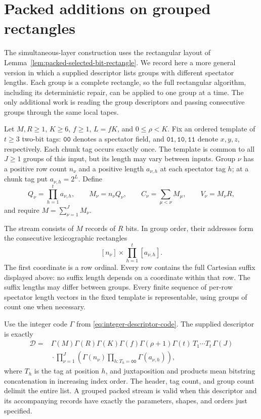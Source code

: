 \section{Packed additions on grouped rectangles}
\label{sec:grouped-rectangles}

The simultaneous-layer construction uses the rectangular layout of
Lemma~\ref{lem:packed-selected-bit-rectangle}. We record here a more
general version in which a supplied descriptor lists groups with different
spectator lengths. Each group is a complete rectangle, so the full
rectangular algorithm, including its deterministic repair, can be applied
to one group at a time. The only additional work is reading the group
descriptors and passing consecutive groups through the same local tapes.

\begin{definition}
\label{def:grouped-packed-stream}
Let $M,R\ge1$, $K\ge6$, $f\ge1$, $L=fK$, and $0\le\rho<K$.
Fix an ordered template of $t\ge3$ two-bit tags: $\mathtt{00}$ denotes
a spectator field, and $\mathtt{01},\mathtt{10},\mathtt{11}$ denote
$x,y,z$, respectively. Each chunk tag occurs exactly once. The template
is common to all $J\ge1$ groups of this input, but its length may vary
between inputs. Group $\nu$ has a positive row count $n_\nu$ and a
positive length $a_{\nu,h}$ at each spectator tag $h$; at a chunk tag
put $a_{\nu,h}=2^L$. Define
\[
 Q_\nu=\prod_{h=1}^t a_{\nu,h},\qquad
 M_\nu=n_\nu Q_\nu,\qquad
 C_\nu=\sum_{\mu<\nu}M_\mu,\qquad V_\nu=M_\nu R,
\]
and require $M=\sum_{\nu=1}^J M_\nu$.

The stream consists of $M$ records of $R$ bits. In group order, their
addresses form the consecutive lexicographic rectangles
\[
 [n_\nu]\times\prod_{h=1}^t[a_{\nu,h}].
\]
The first coordinate is a row ordinal. Every row contains the full
Cartesian suffix displayed above: no suffix length depends on a
coordinate within that row. The suffix lengths may differ between
groups. Every finite sequence of per-row spectator length vectors in
the fixed template is representable, using groups of count one when
necessary.

Use the integer code $\Gamma$ from \eqref{eq:integer-descriptor-code}.
The supplied descriptor
is exactly
\[
\begin{split}
 \mathcal D={}&
 \Gamma(M)\Gamma(R)\Gamma(K)\Gamma(f)\Gamma(\rho+1)\Gamma(t)\,
 T_1\cdots T_t\,\Gamma(J)\\
 &{}\cdot\prod_{\nu=1}^{J}
 \left(\Gamma(n_\nu)
       \prod_{h:T_h=\mathtt{00}}\Gamma(a_{\nu,h})\right),
\end{split}
\]
where $T_h$ is the tag at position $h$, and juxtaposition and products
mean bitstring concatenation in increasing index order. The header,
tag count, and group count delimit the entire list. A grouped packed
stream is valid when this descriptor and its accompanying records have
exactly the parameters, shapes, and orders just specified.
\end{definition}

